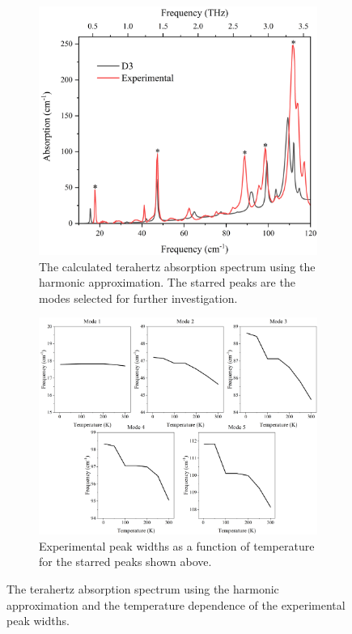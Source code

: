 \begin{figure}[ht!]
\centering
\begin{subfigure}{1\textwidth}
\centering
\includegraphics[scale=0.5]{Figures/Spectra/D3ExpDiffG.png}
\caption{The calculated terahertz absorption spectrum using the harmonic approximation. The starred peaks are the modes selected for further investigation.}
\label{fig:starredpeaks}
\end{subfigure}

\begin{subfigure}{1\textwidth}
\centering
\includegraphics[scale=0.5]{Figures/Misc/QHA/ExpWidthsG.png}
\caption{Experimental peak widths as a function of temperature for the starred peaks shown above.}
\label{fig:exppeakshifts}
\end{subfigure}

\captionsetup{font = footnotesize, justification = centering}
\caption[The Terahertz Absorption Spectrum using the Harmonic Approximation and the Temperature Dependence of the Experimental Peak Widths]{The terahertz absorption spectrum using the harmonic approximation and the temperature dependence of the experimental peak widths.}
\label{Fig:d3_exp_mode_temp}
\end{figure}

